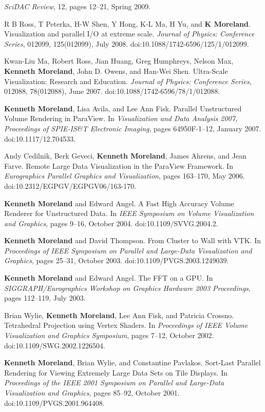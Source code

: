 \begin{enumerate}[label={[\arabic*]}, left=0pt]
  \emph{SciDAC Review}, 12, pages 12--21, Spring 2009.
\item  %
  R B Ross, T Peterka, H-W Shen, Y Hong, K-L Ma, H Yu, and \textbf{K Moreland}.
  Visualization and parallel {I/O} at extreme scale.
  \emph{Journal of Physics: Conference Series}, 012099, 125(012099), July 2008.
  doi:10.1088/1742-6596/125/1/012099.
\item  %
  Kwan-Liu Ma, Robert Ross, Jian Huang, Greg Humphreys, Nelson Max, \textbf{Kenneth Moreland}, John D. Owens, and Han-Wei Shen.
  Ultra-Scale Visualization: Research and Education.
  \emph{Journal of Physics: Conference Series}, 012088, 78(012088), June 2007.
  doi:10.1088/1742-6596/78/1/012088.
\item  %
  \textbf{Kenneth Moreland}, Lisa Avila, and Lee Ann Fisk.
  Parallel Unstructured Volume Rendering in ParaView.
  In \emph{Visualization and Data Analysis 2007, Proceedings of SPIE-IS\&T Electronic Imaging}, pages 64950F-1--12, January 2007.
  doi:10.1117/12.704533.
\item  %
  Andy Cedilnik, Berk Geveci, \textbf{Kenneth Moreland}, James Ahrens, and Jean Farve.
  Remote Large Data Visualization in the {ParaView} Framework.
  In \emph{Eurographics Parallel Graphics and Visualization}, pages 163--170, May 2006.
  doi:10.2312/EGPGV/EGPGV06/163-170.
\item  %
  \textbf{Kenneth Moreland} and Edward Angel.
  A Fast High Accuracy Volume Renderer for Unstructured Data.
  In \emph{IEEE Symposium on Volume Visualization and Graphics}, pages 9--16, October 2004.
  doi:10.1109/SVVG.2004.2.
\item  %
  \textbf{Kenneth Moreland} and David Thompson.
  From Cluster to Wall with {VTK}.
  In \emph{Proceedings of IEEE Symposium on Parallel and Large-Data Visualization and Graphics}, pages 25--31, October 2003.
  doi:10.1109/PVGS.2003.1249039.
\item  %
  \textbf{Kenneth Moreland} and Edward Angel.
  {The FFT on a GPU}.
  In \emph{SIGGRAPH/Eurographics Workshop on Graphics Hardware 2003 Proceedings}, pages 112--119, July 2003.
\item  %
  Brian Wylie, \textbf{Kenneth Moreland}, Lee Ann Fisk, and Patricia Crossno.
  Tetrahedral Projection using Vertex Shaders.
  In \emph{Proceedings of IEEE Volume Visualization and Graphics Symposium}, pages 7--12, October 2002.
  doi:10.1109/SWG.2002.1226504.
\item  %
  \textbf{Kenneth Moreland}, Brian Wylie, and Constantine Pavlakos.
  Sort-Last Parallel Rendering for Viewing Extremely Large Data Sets on Tile Displays.
  In \emph{Proceedings of the IEEE 2001 Symposium on Parallel and Large-Data Visualization and Graphics}, pages 85--92, October 2001.
  doi:10.1109/PVGS.2001.964408.
\end{enumerate}